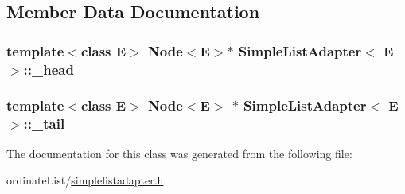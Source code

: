 \subsection{Member Data Documentation}
\hypertarget{class_simple_list_adapter_af8279a43660863dbf56cc31d27c331df}{
\subsubsection[{\-\_\-head}]{\setlength{\rightskip}{0pt plus 5cm}template$<$class E$>$ {\bf Node}$<$E$>$$\ast$ {\bf Simple\-List\-Adapter}$<$ E $>$\-::\-\_\-head\hspace{0.3cm}{\ttfamily [protected]}}}\label{class_simple_list_adapter_af8279a43660863dbf56cc31d27c331df}
\hypertarget{class_simple_list_adapter_aee311f35611a7a15c68ee78ea5b7394c}{
\subsubsection[{\-\_\-tail}]{\setlength{\rightskip}{0pt plus 5cm}template$<$class E$>$ {\bf Node}$<$E$>$ $\ast$ {\bf Simple\-List\-Adapter}$<$ E $>$\-::\-\_\-tail\hspace{0.3cm}{\ttfamily [protected]}}}\label{class_simple_list_adapter_aee311f35611a7a15c68ee78ea5b7394c}


The documentation for this class was generated from the following file\-:\begin{DoxyCompactItemize}
\item 
ordinate\-List/\hyperlink{simplelistadapter_8h}{simplelistadapter.\-h}\end{DoxyCompactItemize}
